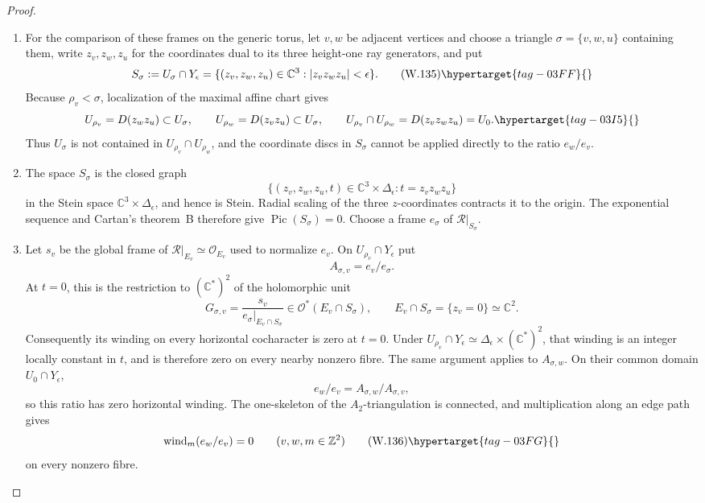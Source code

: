 \begin{proof}
\begin{enumerate}[label=\arabic*.,leftmargin=*]
\item For the comparison of these frames on the generic torus, let \(v,w\) be
adjacent vertices and choose a triangle \(\sigma=\{v,w,u\}\) containing them,
write \(z_v,z_w,z_u\) for the coordinates dual to its three height-one ray
generators, and put
\[
 S_\sigma:=U_\sigma\cap Y_\epsilon
 =\{(z_v,z_w,z_u)\in\mathbb C^3:
       |z_vz_wz_u|<\epsilon\}.
\tag{W.135}\hypertarget{tag-03FF}{}\label{wbII:eq:W:5.17-A34a}
\]
Because \(\rho_v<\sigma\), localization of the maximal affine chart gives
\begin{equation}
 U_{\rho_v}=D(z_wz_u)\subset U_\sigma,\qquad
 U_{\rho_w}=D(z_vz_u)\subset U_\sigma,\qquad
 U_{\rho_v}\cap U_{\rho_w}=D(z_vz_wz_u)=U_0.
\hypertarget{tag-03I5}{}\label{wbII:eq:analytic-toric-open-directions}
\end{equation}
Thus \(U_\sigma\) is not contained in \(U_{\rho_v}\cap U_{\rho_w}\), and
the coordinate discs in \(S_\sigma\) cannot be applied directly to the
ratio \(e_w/e_v\).

\item The space $S_\sigma$ is the closed graph
\[
 \{(z_v,z_w,z_u,t)\in\mathbb C^3\times\Delta_\epsilon:
   t=z_vz_wz_u\}
\]
in the Stein space \(\mathbb C^3\times\Delta_\epsilon\), and hence is
Stein.  Radial scaling of the three \(z\)-coordinates contracts it to the
origin.  The exponential sequence and Cartan's theorem~B therefore give
\(\operatorname{Pic}(S_\sigma)=0\).  Choose a frame \(e_\sigma\) of
\(\mathcal R|_{S_\sigma}\).

\item Let \(s_v\) be the global frame of
\(\mathcal R|_{E_v}\simeq\mathcal O_{E_v}\) used to normalize \(e_v\).
On \(U_{\rho_v}\cap Y_\epsilon\) put
\[
 A_{\sigma,v}=e_v/e_\sigma.
\]
At \(t=0\), this is the restriction to \((\mathbb C^*)^2\) of the
holomorphic unit
\[
 G_{\sigma,v}
 =\frac{s_v}{e_\sigma|_{E_v\cap S_\sigma}}
 \in\mathcal O^*(E_v\cap S_\sigma),
 \qquad E_v\cap S_\sigma=\{z_v=0\}\simeq\mathbb C^2.
\]
Consequently its winding on every horizontal cocharacter is zero at
\(t=0\).  Under
\(U_{\rho_v}\cap Y_\epsilon\simeq
\Delta_\epsilon\times(\mathbb C^*)^2\), that winding is an integer locally
constant in \(t\), and is therefore zero on every nearby nonzero fibre.
The same argument applies to \(A_{\sigma,w}\).  On their common
domain \(U_0\cap Y_\epsilon\),
\[
 e_w/e_v=A_{\sigma,w}/A_{\sigma,v},
\]
so this ratio has zero horizontal winding.  The one-skeleton of the
\(A_2\)-triangulation is connected, and multiplication along an edge path
gives
\[
 \operatorname{wind}_m(e_w/e_v)=0
 \qquad(v,w,m\in\mathbb Z^2)
\tag{W.136}\hypertarget{tag-03FG}{}\label{wbII:eq:W:5.17-A34b}
\]
on every nonzero fibre.


\end{enumerate}
\end{proof}
